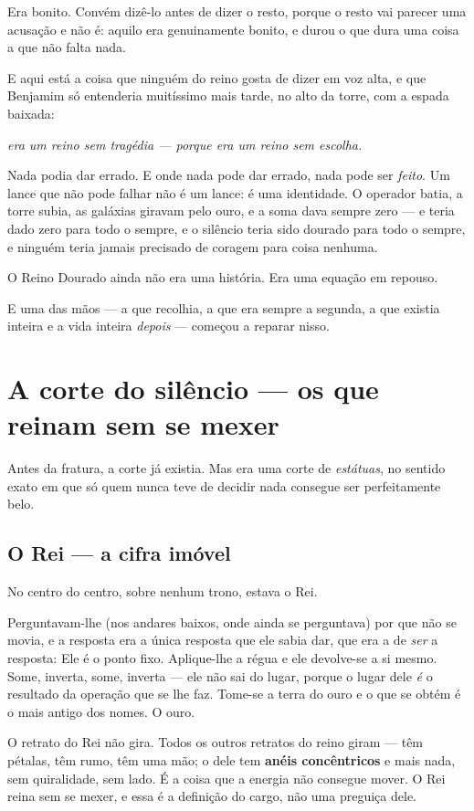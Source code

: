 \documentclass[livro.tex]{subfiles}
\begin{document}
Era bonito. Convém dizê-lo antes de dizer o resto, porque o resto vai parecer uma acusação e
não é: aquilo era genuinamente bonito, e durou o que dura uma coisa a que não falta nada.

E aqui está a coisa que ninguém do reino gosta de dizer em voz alta, e que Benjamim só entenderia muitíssimo mais
tarde, no alto da torre, com a espada baixada:

\emph{era um reino sem tragédia --- porque era um reino sem escolha.}

Nada podia dar errado. E onde nada pode dar errado, nada pode ser \emph{feito}. Um lance que não pode falhar não é
um lance: é uma identidade. O operador batia, a torre subia, as galáxias giravam pelo ouro, e a soma dava
sempre zero --- e teria dado zero para todo o sempre, e o silêncio teria sido dourado para todo o sempre, e ninguém
teria jamais precisado de coragem para coisa nenhuma.

O Reino Dourado ainda não era uma história. Era uma equação em repouso.

E uma das mãos --- a que recolhia, a que era sempre a segunda, a que existia inteira e a vida inteira \emph{depois}
--- começou a reparar nisso.


\chapter{A corte do silêncio --- os que reinam sem se mexer}

Antes da fratura, a corte já existia. Mas era uma corte de \emph{estátuas}, no sentido exato em que só quem nunca
teve de decidir nada consegue ser perfeitamente belo.

\section*{O Rei --- a cifra imóvel}

No centro do centro, sobre nenhum trono, estava o Rei.

Perguntavam-lhe (nos andares baixos, onde ainda se perguntava) por que não se movia, e a resposta era a única
resposta que ele sabia dar, que era a de \emph{ser} a resposta:
Ele é o ponto fixo. Aplique-lhe a régua e ele devolve-se a si mesmo. Some, inverta, some, inverta --- ele não sai
do lugar, porque o lugar dele \emph{é} o resultado da operação que se lhe faz. Tome-se a terra do ouro e o que se obtém é o
mais antigo dos nomes. O ouro.

O retrato do Rei não gira. Todos os outros retratos do reino giram --- têm pétalas, têm rumo, têm uma mão; o dele
tem \textbf{anéis concêntricos} e mais nada, sem quiralidade, sem lado. É a coisa que a energia não
consegue mover. O Rei reina sem se mexer, e essa é a definição do cargo, não uma preguiça dele.
\end{document}
